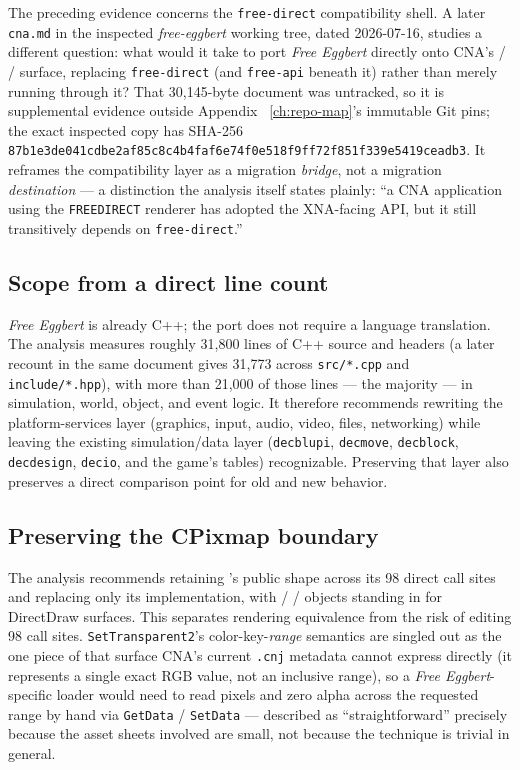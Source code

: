 The preceding evidence concerns the \texttt{free-direct} compatibility shell. A later
\texttt{cna.md} in the inspected \emph{free-eggbert} working tree, dated 2026-07-16, studies a
different question: what would it take to port \emph{Free Eggbert} directly onto CNA's
 /  /  surface, replacing
\texttt{free-direct} (and \texttt{free-api} beneath it) rather than merely running through it?
That 30{,}145-byte document was untracked, so it is supplemental evidence outside Appendix~
\ref{ch:repo-map}'s immutable Git pins; the exact inspected copy has SHA-256
\texttt{87b1e3de041cdbe2af85c8c4b4faf6e74f0e518f9ff72f851f339e5419ceadb3}.
It reframes the compatibility layer as a migration
\emph{bridge}, not a migration \emph{destination} --- a distinction the analysis itself states
plainly: ``a CNA application using the \texttt{FREEDIRECT} renderer has adopted the XNA-facing API, but
it still transitively depends on \texttt{free-direct}.''

\subsection{Scope from a direct line count}

\emph{Free Eggbert} is already C++; the port does not require a language translation. The
analysis measures roughly 31{,}800 lines of C++ source and headers (a later recount in the same
document gives 31{,}773 across
\texttt{src/*.cpp} and \texttt{include/*.hpp}), with more than 21{,}000 of those lines --- the
majority --- in simulation, world, object, and event logic. It therefore recommends rewriting the
platform-services layer (graphics, input, audio, video, files, networking) while leaving the
existing simulation/data layer (\texttt{decblupi}, \texttt{decmove}, \texttt{decblock},
\texttt{decdesign}, \texttt{decio}, and the game's tables) recognizable. Preserving that layer
also preserves a direct comparison point for old and new behavior.

\subsection{Preserving the CPixmap boundary}

The analysis recommends retaining 's public shape across its 98 direct call
sites and replacing only its implementation, with
 /  /  objects standing in for
DirectDraw surfaces. This separates rendering equivalence from the risk of editing 98 call
sites. \texttt{SetTransparent2}'s color-key-\emph{range} semantics are singled
out as the one piece of that surface CNA's current \texttt{.cnj} metadata cannot express
directly (it represents a single exact RGB value, not an inclusive range), so a
\emph{Free Eggbert}-specific loader would need to read pixels and zero alpha across the
requested range by hand via \texttt{GetData} / \texttt{SetData} --- described as
``straightforward'' precisely because the asset sheets involved are small, not because the
technique is trivial in general.

